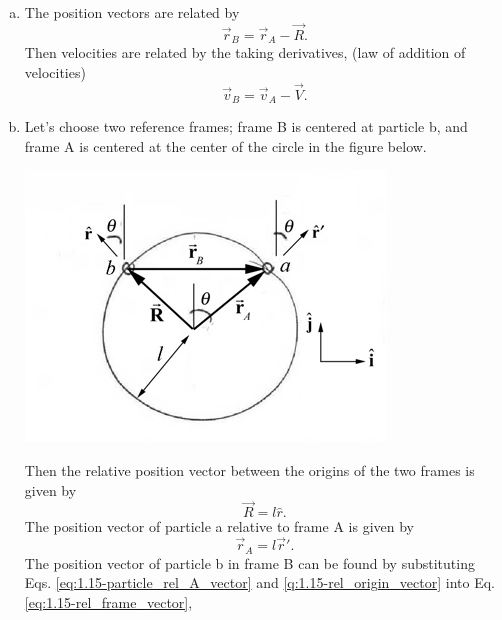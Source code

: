 \documentclass{esg8012pset}
\begin{document}
\begin{solution}
  \begin{enumerate}[a.]
    \item The position vectors are related by 
      \begin{equation} \vec r_B = \vec r_A - \vec R. \label{eq:1.15-rel_frame_vector}\end{equation}
      Then velocities are related by the taking derivatives, (law of addition of velocities) 
      \begin{equation} \vec v_B = \vec v_A - \vec V. \label{eq:1.15-particle_A_vector}\end{equation} %
    \item Let's choose two reference frames; frame B is centered at particle b, and frame A is centered at the center of the circle in the figure below.
      \begin{center}\includegraphics{ps01_Solution_06_01}\end{center}
      Then the relative position vector between the origins of the two frames is given by 
      \begin{equation} \vec R = l\hat r. \label{eq:1.15-rel_origin_vector}\end{equation}
      The position vector of particle a relative to frame A is given by
      \begin{equation} \vec r_A = l\vec r'. \label{eq:1.15-particle_rel_A_vector}\end{equation}
      The position vector of particle b in frame B can be found by substituting Eqs. \ref{eq:1.15-particle_rel_A_vector} and \ref{q:1.15-rel_origin_vector} into Eq. \ref{eq:1.15-rel_frame_vector},

\end{enumerate}
\end{solution}
\end{document}
